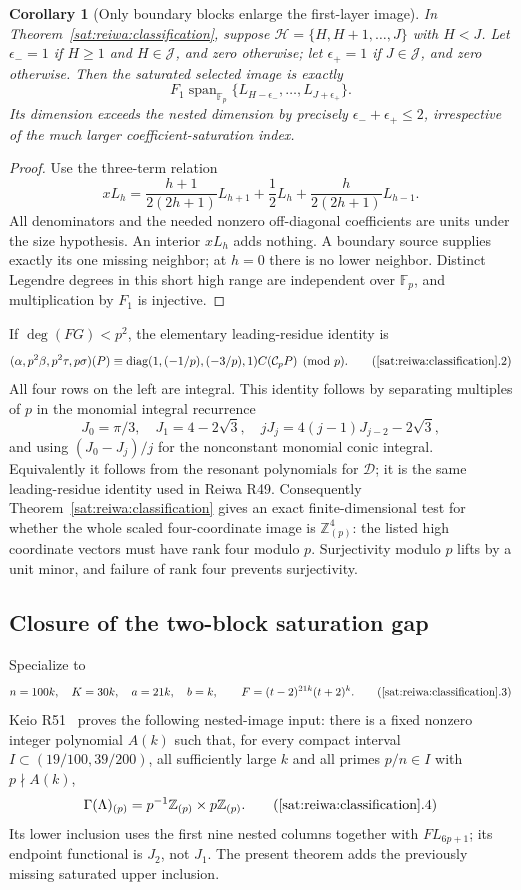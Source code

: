 \documentclass[11pt,a4paper]{article}
\numberwithin{equation}{section}
\newtheorem{corollary}[theorem]{Corollary}
\theoremstyle{definition}\newtheorem{definition}[theorem]{Definition}
\theoremstyle{remark}\newtheorem{remark}[theorem]{Remark}
\begin{document}
\begin{corollary}[Only boundary blocks enlarge the first-layer image]
\label{sat:reiwa:edges}
In Theorem~\ref{sat:reiwa:classification}, suppose
$\mathcal H=\{H,H+1,\ldots,J\}$ with $H<J$. Let
$\epsilon_-=1$ if $H\ge1$ and $H\in\mathcal J$, and zero
otherwise; let $\epsilon_+=1$ if $J\in\mathcal J$, and zero
otherwise. Then the saturated selected image is exactly
\[
 F_1\operatorname{span}_{\mathbb F_p}
       \{L_{H-\epsilon_-},\ldots,L_{J+\epsilon_+}\}.
\]
Its dimension exceeds the nested dimension by precisely
$\epsilon_-+\epsilon_+\le2$, irrespective of the much larger
coefficient-saturation index.
\end{corollary}
\begin{proof}
Use the three-term relation
\[
 xL_h=\frac{h+1}{2(2h+1)}L_{h+1}+\frac12L_h
             +\frac h{2(2h+1)}L_{h-1}.
\]
All denominators and the needed nonzero off-diagonal coefficients
are units under the size hypothesis. An interior $xL_h$ adds
nothing. A boundary source supplies exactly its one missing
neighbor; at $h=0$ there is no lower neighbor. Distinct Legendre
degrees in this short high range are independent over
$\mathbb F_p$, and multiplication by $F_1$ is injective.
\end{proof}

If $\deg(FG)<p^2$, the elementary leading-residue identity is
\[
 (\alpha,p^2\beta,p^2\tau,p\sigma)(P)
 \equiv\operatorname{diag}(1,(-1/p),(-3/p),1)
                 C(\mathcal C_pP)\pmod p.                 \tag{\ref{sat:reiwa:classification}.2}
\]
All four rows on the left are integral. This identity follows by
separating multiples of $p$ in the monomial integral recurrence
\[
 J_0=\pi/3,\quad J_1=4-2\sqrt3,\quad
 jJ_j=4(j-1)J_{j-2}-2\sqrt3,
\]
and using $(J_0-J_j)/j$ for the nonconstant monomial conic
integral. Equivalently it follows from the resonant polynomials
for $\mathcal D$; it is the same leading-residue identity used
in Reiwa R49. Consequently Theorem~\ref{sat:reiwa:classification}
gives an exact finite-dimensional test for whether the whole
scaled four-coordinate image is $\mathbb Z_{(p)}^4$: the
listed high coordinate vectors must have rank four modulo $p$.
Surjectivity modulo $p$ lifts by a unit minor, and failure of
rank four prevents surjectivity.

\subsection{Closure of the two-block saturation gap}
Specialize to
\[
 n=100k,\quad K=30k,\quad a=21k,\quad b=k,
 \qquad F=(t-2)^{21k}(t+2)^k.                           \tag{\ref{sat:reiwa:classification}.3}
\]
Keio R51~\cite{K51} proves the following nested-image input: there is a
fixed nonzero integer polynomial $A(k)$ such that, for every
compact interval $I\subset(19/100,39/200)$, all sufficiently
large $k$ and all primes $p/n\in I$ with $p\nmid A(k)$,
\[
 \Gamma(\Lambda)_{(p)}=p^{-1}\mathbb Z_{(p)}
                                      \times p\mathbb Z_{(p)}. \tag{\ref{sat:reiwa:classification}.4}
\]
Its lower inclusion uses the first nine nested columns together
with $FL_{6p+1}$; its endpoint functional is $J_2$, not $J_1$.
The present theorem adds the previously missing saturated upper
inclusion.
\end{document}
